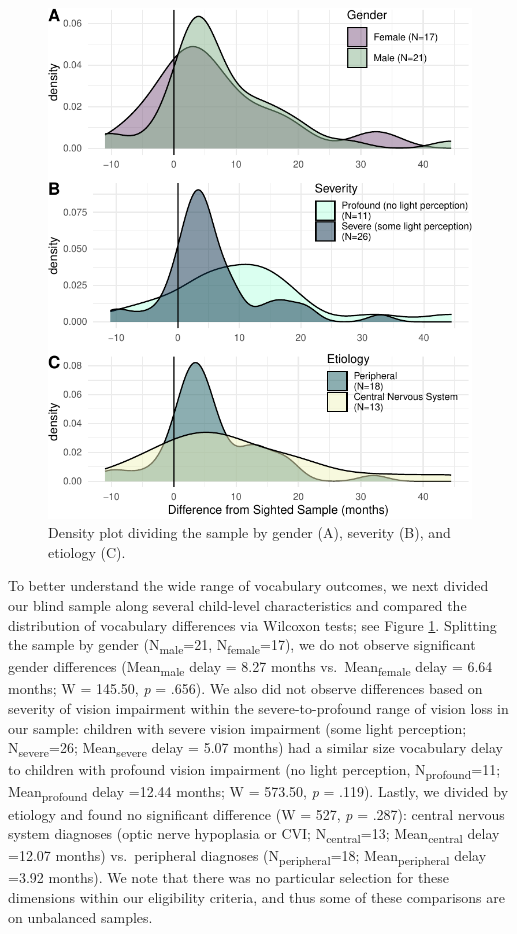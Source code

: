 \documentclass[
  man,floatsintext]{apa6}
\begin{document}
\begin{figure}
\centering
\includegraphics{VI_CDI_manuscript_files/figure-latex/splitting-tests-1.pdf}
\caption{\label{fig:splitting-tests}Density plot dividing the sample by gender (A), severity (B), and etiology (C).}
\end{figure}

To better understand the wide range of vocabulary outcomes, we next divided our blind sample along several child-level characteristics and compared the distribution of vocabulary differences via Wilcoxon tests; see Figure \ref{fig:splitting-tests}. Splitting the sample by gender (N\textsubscript{male}=21, N\textsubscript{female}=17), we do not observe significant gender differences (Mean\textsubscript{male} delay = 8.27 months vs.~Mean\textsubscript{female} delay = 6.64 months; W = 145.50, \emph{p} = .656). We also did not observe differences based on severity of vision impairment within the severe-to-profound range of vision loss in our sample: children with severe vision impairment (some light perception; N\textsubscript{severe}=26; Mean\textsubscript{severe} delay = 5.07 months) had a similar size vocabulary delay to children with profound vision impairment (no light perception, N\textsubscript{profound}=11; Mean\textsubscript{profound} delay =12.44 months; W = 573.50, \emph{p} = .119). Lastly, we divided by etiology and found no significant difference (W = 527, \emph{p} = .287): central nervous system diagnoses (optic nerve hypoplasia or CVI; N\textsubscript{central}=13; Mean\textsubscript{central} delay =12.07 months) vs.~peripheral diagnoses (N\textsubscript{peripheral}=18; Mean\textsubscript{peripheral} delay =3.92 months). We note that there was no particular selection for these dimensions within our eligibility criteria, and thus some of these comparisons are on unbalanced samples.
\end{document}

